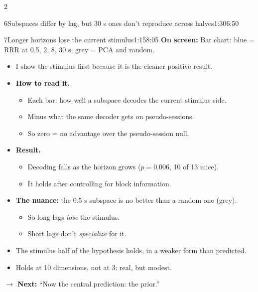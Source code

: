 \documentclass[10pt]{article}
\newcommand{\point}[1]{{\color{ink}\textbf{On screen:} #1}\par}
\newcommand{\bridge}[1]{\par{\color{accent}\textbf{$\rightarrow$ Next:} #1}\par}
\begin{document}
\begin{multicols}{2}
\begin{slidebox}{6}{Subspaces differ by lag, but 30 s ones don't reproduce across halves}{1:30}{6:50}
\end{slidebox}
\begin{slidebox}{7}{Longer horizons lose the current stimulus}{1:15}{8:05}
\point{Bar chart: blue = RRR at 0.5, 2, 8, 30 s; grey = PCA and random.}
\begin{itemize}
\item I show the stimulus first because it is the cleaner positive result.
\item \textbf{How to read it.}
  \begin{itemize}
  \item Each bar: how well a subspace decodes the current stimulus side.
  \item Minus what the same decoder gets on pseudo-sessions.
  \item So zero = no advantage over the pseudo-session null.
  \end{itemize}
\item \textbf{Result.}
  \begin{itemize}
  \item Decoding falls as the horizon grows ($p = 0.006$, 10 of 13 mice).
  \item It holds after controlling for block information.
  \end{itemize}
\item \textbf{The nuance:} the 0.5 s subspace is no better than a random one (grey).
  \begin{itemize}
  \item So long lags \emph{lose} the stimulus.
  \item Short lags don't \emph{specialize} for it.
  \end{itemize}
\item The stimulus half of the hypothesis holds, in a weaker form than predicted.
\item Holds at 10 dimensions, not at 3: real, but modest.
\end{itemize}
\bridge{``Now the central prediction: the prior.''}


\end{slidebox}
\end{multicols}
\end{document}
